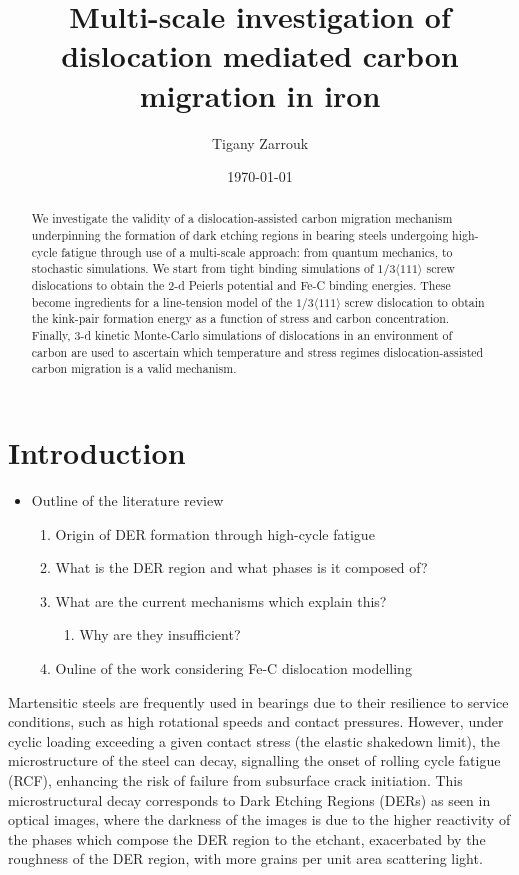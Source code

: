 \documentclass[a4paper]{article}
\author{Tigany Zarrouk}
\date{\today}
\title{Multi-scale investigation of dislocation mediated carbon migration in iron}
\begin{document}
\maketitle
\tableofcontents

\begin{abstract}

We investigate the validity of a dislocation-assisted carbon migration
mechanism underpinning the formation of dark etching regions in
bearing steels undergoing high-cycle fatigue through use of a
multi-scale approach: from quantum mechanics,
to stochastic simulations. We start from tight binding simulations of
$1/3\langle 111 \rangle$ screw dislocations to obtain the 2-d Peierls
potential and Fe-C binding energies. These become ingredients for a line-tension
model of the $1/3\langle 111 \rangle$ screw dislocation to obtain the kink-pair formation
energy as a function of stress and carbon concentration. Finally,
3-d kinetic Monte-Carlo simulations of dislocations in an environment
of carbon are used to ascertain which temperature and stress regimes
dislocation-assisted carbon migration is a valid mechanism. 

\end{abstract}


\section{Introduction}
\label{sec:orgd3d1dfd}

\begin{itemize}
\item Outline of the literature review 
\begin{enumerate}
\item Origin of DER formation through high-cycle fatigue
\item What is the DER region and what phases is it composed of?
\item What are the current mechanisms which explain this?
\begin{enumerate}
\item Why are they insufficient?
\end{enumerate}
\item Ouline of the work considering Fe-C dislocation modelling
\end{enumerate}
\end{itemize}


Martensitic steels are frequently used in bearings due to their
resilience to service conditions, such as high rotational speeds and
contact pressures. However, under cyclic loading exceeding a given
contact stress (the elastic shakedown limit), the microstructure of
the steel can decay, signalling the onset of rolling cycle fatigue
(RCF), enhancing the risk of failure from subsurface crack
initiation. This microstructural decay corresponds to Dark Etching
Regions (DERs) as seen in optical images, where the darkness of the images
is due to the higher reactivity of the phases which compose the DER
region to the etchant, exacerbated by the roughness of the DER
region, with more grains per unit
area scattering light.
\end{document}
